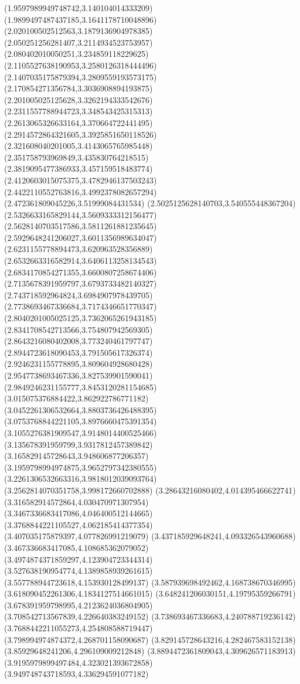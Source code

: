 {(1.9597989949748742,3.140104014333209)
(1.9899497487437185,3.1641178710048896)
(2.020100502512563,3.1879136904978385)
(2.050251256281407,3.2114934523753957)
(2.080402010050251,3.234859118229625)
(2.1105527638190953,3.2580126318444496)
(2.1407035175879394,3.2809559193573175)
(2.170854271356784,3.3036908894193875)
(2.201005025125628,3.3262194333542676)
(2.2311557788944723,3.348543425315313)
(2.2613065326633164,3.370664722441495)
(2.2914572864321605,3.3925851650118526)
(2.321608040201005,3.4143065765985448)
(2.351758793969849,3.435830764218515)
(2.3819095477386933,3.457159518483774)
(2.4120603015075375,3.4782946137503243)
(2.4422110552763816,3.4992378082657294)
(2.472361809045226,3.51999084431534)
(2.5025125628140703,3.540555448367204)
(2.5326633165829144,3.5609333312156477)
(2.5628140703517586,3.5811261881235645)
(2.5929648241206027,3.6011356989634047)
(2.6231155778894473,3.620963528356889)
(2.6532663316582914,3.6406113258134543)
(2.6834170854271355,3.6600807258674406)
(2.7135678391959797,3.6793733482140327)
(2.743718592964824,3.6984907978439705)
(2.7738693467336684,3.7174346651770347)
(2.8040201005025125,3.7362065261943185)
(2.8341708542713566,3.754807942569305)
(2.8643216080402008,3.773240461797747)
(2.8944723618090453,3.791505617326374)
(2.9246231155778895,3.809604928680428)
(2.9547738693467336,3.827539901590041)
(2.9849246231155777,3.8453120281154685)
(3.015075376884422,3.862922786771182)
(3.0452261306532664,3.8803736426488395)
(3.0753768844221105,3.8976660475391354)
(3.1055276381909547,3.9148014400525466)
(3.135678391959799,3.9317812457389842)
(3.165829145728643,3.948606877206357)
(3.1959798994974875,3.9652797342380555)
(3.2261306532663316,3.9818012039093764)
(3.2562814070351758,3.998172660702888)
(3.28643216080402,4.014395466622741)
(3.316582914572864,4.030470971307954)
(3.3467336683417086,4.046400512144665)
(3.3768844221105527,4.062185414377354)
(3.407035175879397,4.077826991219079)
(3.437185929648241,4.093326543960688)
(3.467336683417085,4.108685362079052)
(3.4974874371859297,4.123904723344314)
(3.527638190954774,4.1389858939261615)
(3.557788944723618,4.153930128499137)
(3.587939698492462,4.168738670346995)
(3.618090452261306,4.1834127514661015)
(3.648241206030151,4.19795359266791)
(3.678391959798995,4.2123624036804905)
(3.708542713567839,4.226640383249152)
(3.738693467336683,4.240788719236142)
(3.7688442211055273,4.254808588719447)
(3.798994974874372,4.268701158090687)
(3.829145728643216,4.282467583152138)
(3.85929648241206,4.296109009212848)
(3.8894472361809043,4.309626571183913)
(3.9195979899497484,4.323021393672858)
(3.949748743718593,4.336294591077182)
}
